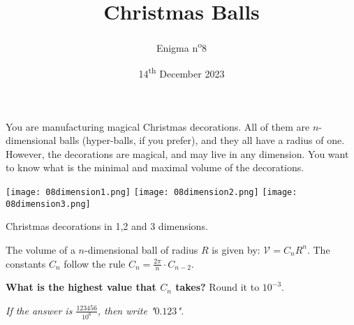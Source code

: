 \documentclass[a4paper, top=10mm]{article}
\title{\textbf{\huge{Christmas Balls}}}
\author{Enigma n\textsuperscript{o}8}
\date{14\textsuperscript{th} December 2023}
\begin{document}
	\maketitle
	
	You are manufacturing magical Christmas decorations.
	All of them  are $n$-dimensional balls (hyper-balls, if you prefer), and they all have a radius of one.
	However, the decorations are magical, and may live in any dimension.
	You want to know what is the minimal and maximal volume of the decorations.
	
	\begin{center}
		\texttt{[image: 08dimension1.png]}	\texttt{[image: 08dimension2.png]}		\texttt{[image: 08dimension3.png]}
		
		Christmas decorations in 1,2 and 3 dimensions.
	\end{center}
	
	The volume of a $n$-dimensional ball of radius $R$ is given by: $\mathcal{V} = C_n R^n$.
	The constants $C_n$ follow the rule $C_n = \frac{2\pi}{n} \cdot C_{n-2}$.
	
	\vspace{3cm}
	
	\textbf{What is the highest value that $C_n$ takes?} Round it to $10^{-3}$.
	
	\vspace{1cm}
	
	\textit{If the answer is $\frac{123456}{10^6}$, then write "$0.123$".}
	
\end{document}
